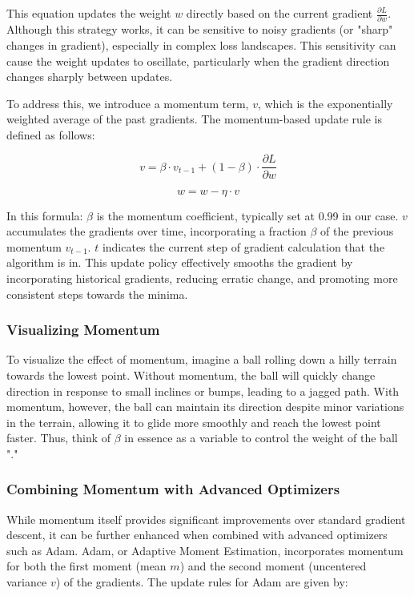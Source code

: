 This equation updates the weight $w$ directly based on the current gradient $\frac{\partial L}{\partial w}$. Although this strategy works, it can be sensitive to noisy gradients (or "sharp" changes in gradient), especially in complex loss landscapes. This sensitivity can cause the weight updates to oscillate, particularly when the gradient direction changes sharply between updates.

To address this, we introduce a momentum term, $v$, which is the exponentially weighted average of the past gradients. The momentum-based update rule is defined as follows:

\[v = \beta \cdot v_{t-1} + (1 - \beta) \cdot \frac{\partial L}{\partial w}\]

\[w = w - \eta \cdot v\]

In this formula: $\beta$ is the momentum coefficient, typically set at 0.99 in our case. $v$ accumulates the gradients over time, incorporating a fraction $\beta$ of the previous momentum $v_{t-1}$. $t$ indicates the current step of gradient calculation that the algorithm is in.
This update policy effectively smooths the gradient by incorporating historical gradients, reducing erratic change, and promoting more consistent steps towards the minima.

\subsubsection*{Visualizing Momentum}

To visualize the effect of momentum, imagine a ball rolling down a hilly terrain towards the lowest point. Without momentum, the ball will quickly change direction in response to small inclines or bumps, leading to a jagged path. With momentum, however, the ball can maintain its direction despite minor variations in the terrain, allowing it to glide more smoothly and reach the lowest point faster. Thus, think of $\beta$ in essence as a variable to control the weight of the ball "\cite{3b1b_2}."

\subsubsection*{Combining Momentum with Advanced Optimizers}

While momentum itself provides significant improvements over standard gradient descent, it can be further enhanced when combined with advanced optimizers such as Adam. Adam, or Adaptive Moment Estimation, incorporates momentum for both the first moment (mean $m$) and the second moment (uncentered variance $v$) of the gradients. The update rules for Adam are given by:

